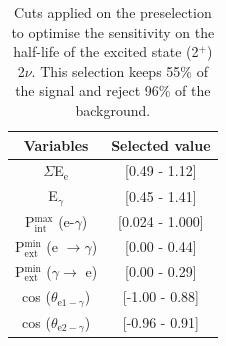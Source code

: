 \documentclass[main.tex]{subfiles}
\begin{document}
\begin{table}[h!]
\centering
\begin{tabular}{c|c}
Variables & Selected value \\
\toprule
$\Sigma$E$_{\text{e}}$ & [0.49 - 1.12] \\
E$_{\gamma}$    & [0.45 - 1.41] \\
P$_{\text{int}}^{\text{max}}$ (e-$\gamma$) & [0.024 - 1.000] \\
P$_{\text{ext}}^{\text{min}}$ (e $\rightarrow \gamma$) & [0.00 - 0.44] \\
P$_{\text{ext}}^{\text{min}}$ ($\gamma \rightarrow$ e) & [0.00 - 0.29] \\
cos ($\theta_{\text{e1}-\gamma}$) & [-1.00 - 0.88] \\
cos ($\theta_{\text{e2}-\gamma}$) & [-0.96 - 0.91] \\
\bottomrule
\end{tabular}
\caption{Cuts applied on the preselection to optimise the sensitivity on the half-life of the excited state (2$^+$) 2$\nu$. This selection keeps 55\% of the signal and reject 96\% of the background.}
\label{tab:Cuts2nu2Plus250keV}
\end{table}
\end{document}
